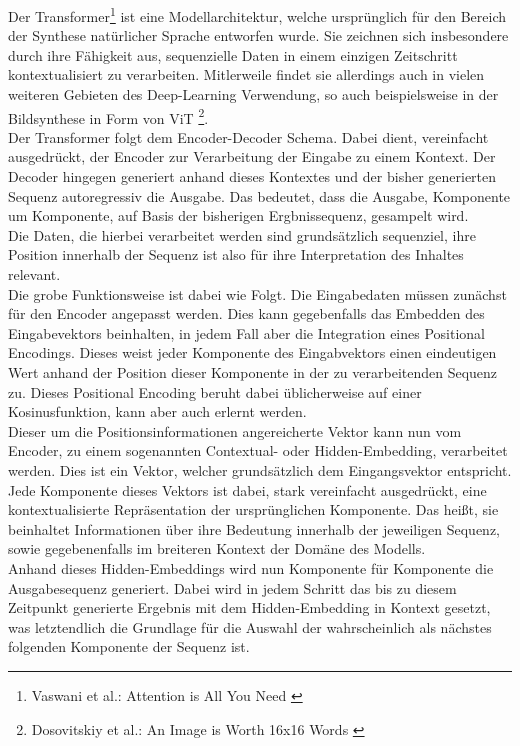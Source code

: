Der Transformer\footnote{
    Vaswani et al.: Attention is All You Need
    \cite{vaswani2023attentionneed}
} ist eine Modellarchitektur, welche ursprünglich für den Bereich der Synthese natürlicher Sprache entworfen wurde. Sie zeichnen sich insbesondere durch ihre Fähigkeit aus, sequenzielle Daten in einem einzigen Zeitschritt kontextualisiert zu verarbeiten. Mitlerweile findet sie allerdings auch in vielen weiteren Gebieten des Deep-Learning Verwendung, so auch beispielsweise in der Bildsynthese in Form von \ac{ViT} \footnote{
    Dosovitskiy et al.: An Image is Worth 16x16 Words 
    \cite{dosovitskiy2021imageworth16x16words}
}. \\ 
Der Transformer folgt dem Encoder-Decoder Schema. Dabei dient, vereinfacht ausgedrückt, der Encoder zur Verarbeitung der Eingabe zu einem Kontext. Der Decoder hingegen generiert anhand dieses Kontextes und der bisher generierten Sequenz autoregressiv die Ausgabe. Das bedeutet, dass die Ausgabe, Komponente um Komponente, auf Basis der bisherigen Ergbnissequenz, gesampelt wird. \\ 
Die Daten, die hierbei verarbeitet werden sind grundsätzlich sequenziel, ihre Position innerhalb der Sequenz ist also für ihre Interpretation des Inhaltes relevant. \\
Die grobe Funktionsweise ist dabei wie Folgt. Die Eingabedaten müssen zunächst für den Encoder angepasst werden. Dies kann gegebenfalls das Embedden des Eingabevektors beinhalten, in jedem Fall aber die Integration eines Positional Encodings. Dieses weist jeder Komponente des Eingabvektors einen eindeutigen Wert anhand der Position dieser Komponente in der zu verarbeitenden Sequenz zu. Dieses Positional Encoding beruht dabei üblicherweise auf einer Kosinusfunktion, kann aber auch erlernt werden. \\
Dieser um die Positionsinformationen angereicherte Vektor kann nun vom Encoder, zu einem sogenannten Contextual- oder Hidden-Embedding, verarbeitet werden. Dies ist ein Vektor, welcher grundsätzlich dem Eingangsvektor entspricht. Jede Komponente dieses Vektors ist dabei, stark vereinfacht ausgedrückt, eine kontextualisierte Repräsentation der ursprünglichen Komponente. Das heißt, sie beinhaltet Informationen über ihre Bedeutung innerhalb der jeweiligen Sequenz, sowie gegebenenfalls im breiteren Kontext der Domäne des Modells. \\
Anhand dieses Hidden-Embeddings wird nun Komponente für Komponente die Ausgabesequenz generiert. Dabei wird in jedem Schritt das bis zu diesem Zeitpunkt generierte Ergebnis mit dem Hidden-Embedding in Kontext gesetzt, was letztendlich die Grundlage für die Auswahl der wahrscheinlich als nächstes folgenden Komponente der Sequenz ist.

